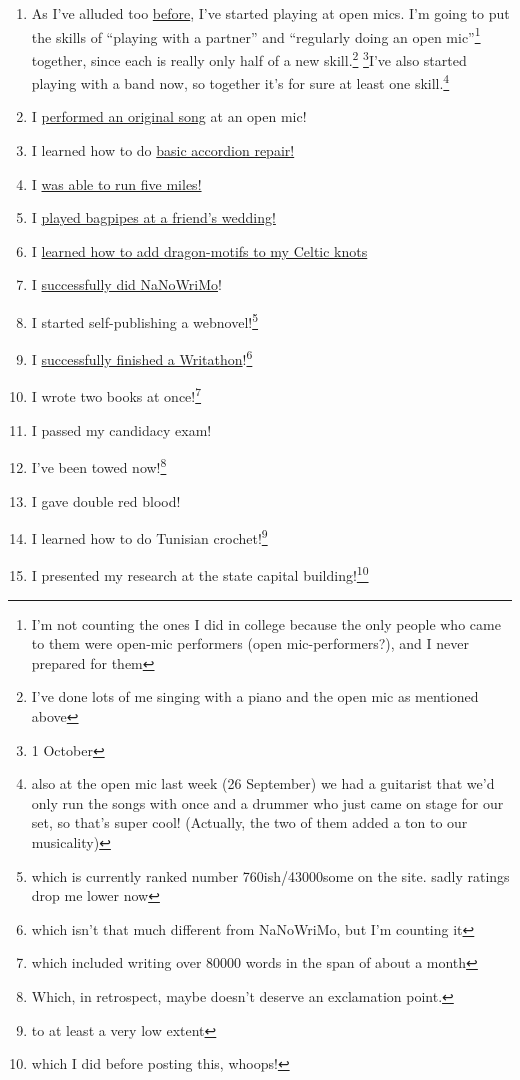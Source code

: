 \documentclass[12pt]{article}[titlepage]
\newcommand{\say}[1]{``#1''}
\newcommand{\1}{\={a}}
\newcommand{\2}{\={e}}
\newcommand{\3}{\={\i}}
\newcommand{\4}{\=o}
\newcommand{\5}{\=u}
\newcommand{\6}{\={A}}
\renewcommand{\,}{\textsuperscript{,}}
\begin{document}
\begin{enumerate}
\item As I've alluded too \href{open-mic-2.html}{before}, I've started playing at open mics.
I'm going to put the skills of \say{playing with a partner} and \say{regularly doing an open mic}\footnote{I'm not counting the ones I did in college because the only people who came to them were open-mic performers (open mic-performers?), and I never prepared for them} together, since each is really only half of a new skill.\footnote{I've done lots of me singing with a piano and the open mic as mentioned above} \footnote{1 October}I've also started playing with a band now, so together it's for sure at least one skill.\footnote{also at the open mic last week (26 September) we had a guitarist that we'd only run the songs with once and a drummer who just came on stage for our set, so that's super cool! (Actually, the two of them added a ton to our musicality)}
\item I \href{performing-a-song.html}{performed an original song} at an open mic!
\item I learned how to do \href{accordion-repair.html}{basic accordion repair!}
\item I \href{running-2.html}{was able to run five miles!} 
\item I \href{bagpipes.html}{played bagpipes at a friend's wedding!}
\item I \href{celtic-knots.html}{learned how to add dragon-motifs to my Celtic knots}
\item I \href{nanowrimo-4.html}{successfully did NaNoWriMo}!
\item I started self-publishing a webnovel!\footnote{which is currently ranked number 760ish/43000some on the site. sadly ratings drop me lower now}
\item I \href{writathon-23-april.html}{successfully finished a Writathon}!\footnote{which isn't that much different from NaNoWriMo, but I'm counting it}
\item I wrote two books at once!\footnote{which included writing over 80000 words in the span of about a month}
\item I passed my candidacy exam!
\item I've been towed now!\footnote{Which, in retrospect, maybe doesn't deserve an exclamation point.}
\item I gave double red blood!
\item I learned how to do Tunisian crochet!\footnote{to at least a very low extent}
\item I presented my research at the state capital building!\footnote{which I did before posting this, whoops!}

\end{enumerate}
\end{document}
